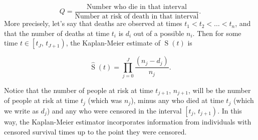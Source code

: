 \documentclass[
  openany]{book}
\theoremstyle{definition}
\theoremstyle{definition}
\theoremstyle{definition}
\theoremstyle{definition}
\theoremstyle{remark}
\begin{document}
\[Q = \frac{\text{Number who die in that interval}}{\text{Number at risk of death in that interval}}.\]
More precisely, let's say that deaths are observed at times \(t_1<t_2<\ldots < t_n\), and that the number of deaths at time \(t_i\) is \(d_i\) out of a possible \(n_i\). Then for some time \(t\in\left[t_J,\,t_{J+1}\right)\), the Kaplan-Meier estimate of \(\operatorname{S}\left(t\right)\) is

\[\hat{\operatorname{S}}\left(t\right) = \prod\limits_{j=0}^J \frac{\left(n_j - d_j\right)}{n_j}.\]

Notice that the number of people at risk at time \(t_{j+1}\), \(n_{j+1}\), will be the number of people at risk at time \(t_j\) (which was \(n_j\)), minus any who died at time \(t_j\) (which we write as \(d_j\)) and any who were censored in the interval \(\left[t_j,\,t_{j+1}\right)\). In this way, the Kaplan-Meier estimator incorporates information from individuals with censored survival times up to the point they were censored.
\end{document}
